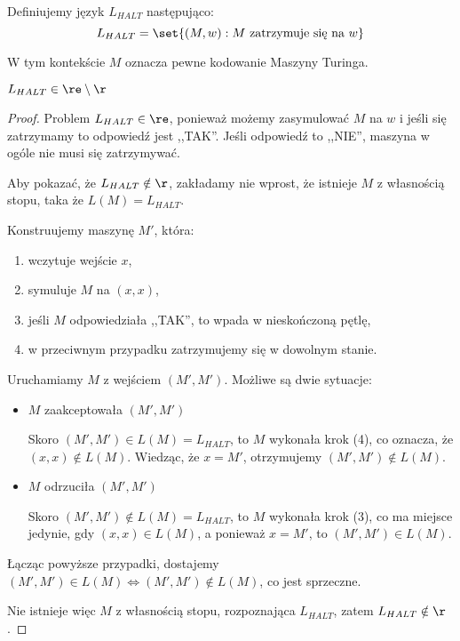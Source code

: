 \begin{definition}
    Definiujemy język \( L_{HALT} \) następująco:
    \[
        L_{HALT} = \set{(M, w) : M \text{ zatrzymuje się na } w}
    \]
\end{definition}
W tym kontekście \(M\) oznacza pewne kodowanie Maszyny Turinga. 

\begin{theorem}
    \( L_{HALT} \in \re \setminus \r \)
\end{theorem}
\begin{proof}
    Problem \( L_{HALT} \in \re \), ponieważ możemy zasymulować \( M \) na \( w \) i jeśli się zatrzymamy to odpowiedź jest ,,TAK''. Jeśli odpowiedź to ,,NIE'', maszyna w ogóle nie musi się zatrzymywać.
    
    Aby pokazać, że \( L_{HALT} \notin \r \), zakładamy nie wprost, że istnieje \( M \) z własnością stopu, taka że \( L(M) = L_{HALT} \).
    
    Konstruujemy maszynę \( M' \), która:
    \begin{enumerate}
        \item wczytuje wejście \( x \),
        \item symuluje \( M \) na \( (x, x) \),
        \item jeśli \( M \) odpowiedziała ,,TAK'', to wpada w nieskończoną pętlę,
        \item w przeciwnym przypadku zatrzymujemy się w dowolnym stanie.
    \end{enumerate}
    
    Uruchamiamy \( M \) z wejściem \( (M', M') \). Możliwe są dwie sytuacje:
    \begin{itemize}
        \item \( M \) zaakceptowała \( (M', M') \)

        Skoro \( (M', M') \in L(M) = L_{HALT} \), to  \(M\) wykonała krok (4), co oznacza, że \( (x, x) \notin L(M) \). Wiedząc, że \( x = M' \), otrzymujemy \( (M', M') \notin L(M) \).

        \item \( M \) odrzuciła \( (M', M') \)

        Skoro \( (M', M') \notin L(M) = L_{HALT} \), to \(M\) wykonała krok (3), co ma miejsce jedynie, gdy \( (x, x) \in L(M) \), a ponieważ \( x = M' \), to \( (M', M') \in L(M) \).
    \end{itemize}
    Łącząc powyższe przypadki, dostajemy \( (M', M') \in L(M) \iff (M', M') \notin L(M) \), co jest sprzeczne. 
    
    Nie istnieje więc \( M \) z własnością stopu, rozpoznająca \( L_{HALT} \), zatem \( L_{HALT} \notin \r \).
\end{proof}